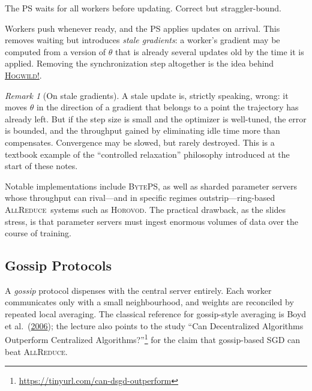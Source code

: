 \documentclass[11pt,a4paper]{article}
\theoremstyle{definition}
\theoremstyle{remark}
\newtheorem*{remark}{Remark}
\theoremstyle{plain}
\newcommand{\allreduce}{\textsc{AllReduce}}
\begin{document}
\begin{description}[leftmargin=1.5em, style=nextline]
  \item[Synchronous mode.] The PS waits for all workers before updating.
        Correct but straggler-bound.
  \item[Asynchronous mode.] Workers push whenever ready, and the PS
        applies updates on arrival. This removes waiting but introduces
        \emph{stale gradients}: a worker's gradient may be computed from a
        version of $\theta$ that is already several updates old by the
        time it is applied. Removing the synchronization step altogether
        is the idea behind
        \href{https://arxiv.org/abs/1106.5730}{\textsc{Hogwild!}}.
\end{description}

\begin{remark}[On stale gradients]
A stale update is, strictly speaking, wrong: it moves $\theta$ in the
direction of a gradient that belongs to a point the trajectory has already
left. But if the step size is small and the optimizer is well-tuned, the
error is bounded, and the throughput gained by eliminating idle time more
than compensates. Convergence may be slowed, but rarely destroyed. This is
a textbook example of the ``controlled relaxation'' philosophy introduced
at the start of these notes.
\end{remark}

Notable implementations include \textsc{BytePS}, as well as sharded
parameter servers whose throughput can rival---and in specific regimes
outstrip---ring-based \allreduce\ systems such as \textsc{Horovod}. The
practical drawback, as the slides stress, is that parameter servers must
ingest enormous volumes of data over the course of training.

\subsection{Gossip Protocols}

A \emph{gossip} protocol dispenses with the central server entirely. Each
worker communicates only with a small neighbourhood, and weights are
reconciled by repeated local averaging. The classical reference for
gossip-style averaging is Boyd et al.\
(\href{https://tinyurl.com/boyd-gossip-2006}{2006}); the lecture also
points to the study ``Can Decentralized Algorithms Outperform Centralized
Algorithms?''\footnote{\url{https://tinyurl.com/can-dsgd-outperform}} for
the claim that gossip-based SGD can beat \allreduce.
\end{document}
